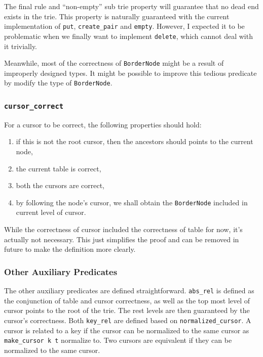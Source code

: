 \documentclass[runningheads]{llncs}
\begin{document}
The final rule and ``non-empty'' sub trie property will guarantee that no dead
end exists in the trie. This property is naturally guaranteed with the current
implementation of \texttt{put}, \texttt{create\_pair} and \texttt{empty}.
However, I expected it to be problematic when we finally want to implement
\texttt{delete}, which cannot deal with it trivially.

Meanwhile, most of the correctness of \texttt{BorderNode} might be a result of
improperly designed types. It might be possible to improve this tedious
predicate by modify the type of \texttt{BorderNode}.

\subsubsection{\texttt{cursor\_correct}}

For a cursor to be correct, the following properties should hold:

\begin{enumerate}
\item if this is not the root cursor, then the ancestors should points to the
  current node,
\item the current table is correct,
\item both the cursors are correct,
\item by following the node's cursor, we shall obtain the \texttt{BorderNode}
  included in current level of cursor.
\end{enumerate}

While the correctness of cursor included the correctness of table for now, it's
actually not necessary. This just simplifies the proof and can be removed in
future to make the definition more clearly.

\subsubsection{Other Auxiliary Predicates}

The other auxiliary predicates are defined straightforward. \texttt{abs\_rel} is
defined as the conjunction of table and cursor correctness, as well as the top
most level of cursor points to the root of the trie. The rest levels are
then guaranteed by the cursor's correctness. Both \texttt{key\_rel} are defined
based on \texttt{normalized\_cursor}. A cursor is related to a key if the cursor
can be normalized to the same cursor as \texttt{make\_cursor k t} normalize to.
Two cursors are equivalent if they can be normalized to the same cursor.
\end{document}
